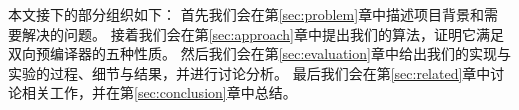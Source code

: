 本文接下的部分组织如下：
首先我们会在第\ref{sec:problem}章中描述项目背景和需要解决的问题。
接着我们会在第\ref{sec:approach}章中提出我们的算法，证明它满足双向预编译器的五种性质。
然后我们会在第\ref{sec:evaluation}章中给出我们的实现与实验的过程、细节与结果，并进行讨论分析。
最后我们会在第\ref{sec:related}章中讨论相关工作，并在第\ref{sec:conclusion}章中总结。



